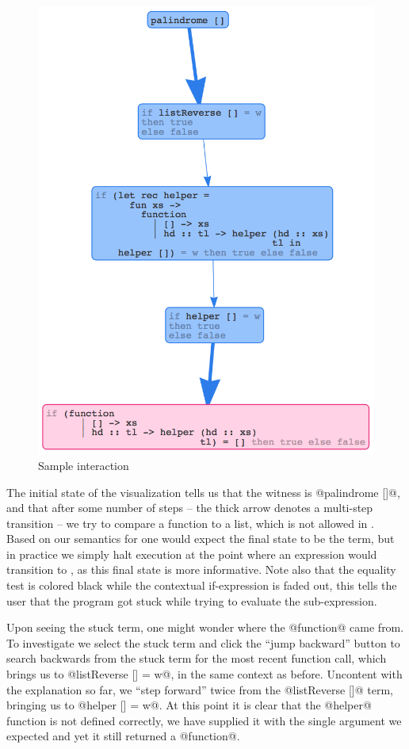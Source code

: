 \begin{figure}[ht]
\begin{minipage}{0.49\linewidth}
\includegraphics[width=\linewidth]{palindrome3}
\end{minipage}
\caption{Sample interaction}
\label{fig:nanomaly-palindrome}
\end{figure}
%
The initial state of the visualization tells us that the witness is
@palindrome []@, and that after some number of steps -- the thick arrow
denotes a multi-step transition -- we try to compare a function to a
list, which is not allowed in \ocaml.
%
Based on our semantics for \lang one would expect the final state to be
the \stuck term, but in practice we simply halt execution at the point
where an expression would transition to \stuck, as this final state is
more informative.
%
Note also that the equality test is colored black while the contextual
if-expression is faded out, this tells the user that the program got
stuck while trying to evaluate the sub-expression.

Upon seeing the stuck term, one might wonder where the @function@
came from.
%
To investigate we select the stuck term and click the ``jump backward''
button to search backwards from the stuck term for the most recent
function call, which brings us to @listReverse [] = w@, in the same
context as before.
%
Uncontent with the explanation so far, we ``step forward'' twice from
the @listReverse []@ term, bringing us to @helper [] = w@.
%
At this point it is clear that the @helper@ function is not defined
correctly, we have supplied it with the single argument we expected and
yet it still returned a @function@.

